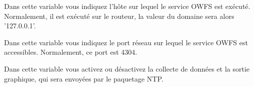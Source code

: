 \begin{description}

  Dans cette variable vous indiquez l'hôte sur lequel le service OWFS est
  exécuté. Normalement, il est exécuté sur le routeur, la valeur du domaine
  sera alors '127.0.0.1'.


  Dans cette variable vous indiquez le port réseau sur lequel le service OWFS
  est accessibles. Normalement, ce port est 4304.


  Dans cette variable vous activez ou désactivez la collecte de données et
  la sortie graphique, qui sera envoyées par le paquetage NTP.

\end{description}
